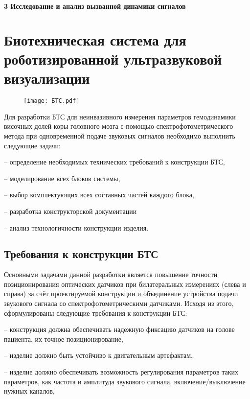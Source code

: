 \newpage
\textbf{3 Исследование и анализ вызванной динамики сигналов}



\section{Биотехническая система для роботизированной
ультразвуковой визуализации}
\begin{figure}[!h]
\begin{center}
\texttt{[image: БТС.pdf]}
\caption{\centering {}}
\label{БТС}
\end{center}
\end{figure}

Для разработки БТС для неинвазивного измерения параметров гемодинамики височных долей коры головного мозга с помощью спектрофотометрического метода при одновременной подаче звуковых сигналов необходимо выполнить следующие задачи:

– определение необходимых технических требований к конструкции БТС,

– моделирование всех блоков системы,

– выбор комплектующих всех составных частей каждого блока,

– разработка конструкторской документации

– анализ технологичности конструкции изделия.

\subsection{Требования к конструкции БТС}
Основными задачами данной разработки является повышение точности позиционирования оптических датчиков при билатеральных измерениях (слева и справа) за счёт проектируемой конструкции и объединение устройства подачи звукового сигнала со спектрофотометрическими датчиками. Исходя из этого, сформулированы следующие требования к конструкции БТС:

– конструкция должна обеспечивать надежную фиксацию датчиков на голове пациента, их точное позиционирование,

– изделие должно быть устойчиво к двигательным артефактам,

– изделие должно обеспечивать возможность регулирования параметров таких параметров, как частота и амплитуда звукового сигнала, включение/выключение нужных каналов,

